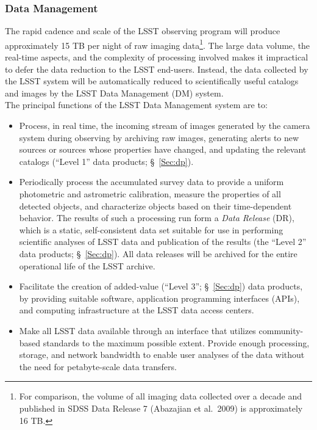 \documentclass{emulateapj}
\begin{document}
\vskip 0.2in
\subsubsection{ Data Management }
\label{sec:dm}

The rapid cadence and scale of the LSST observing program will produce
approximately 15 TB per night of raw imaging data\footnote{For
  comparison, the volume of all imaging data collected over a decade
  and published in SDSS Data Release 7 (Abazajian et al.~2009) is approximately 16 TB.}. The large data volume, the real-time aspects, and the complexity of processing involved makes it impractical to defer the data reduction to the LSST end-users. Instead, the data collected by the LSST system will be automatically reduced to scientifically useful catalogs and images by the LSST Data Management (DM) system.
\\

The principal functions of the LSST Data Management system are to: 
\begin{itemize}
\item Process, in real time, the incoming stream of images generated by the camera system during observing by archiving raw images, generating alerts to new sources or sources whose properties have changed, and updating the relevant catalogs (``Level 1'' data products; \S~\ref{Sec:dp}).
\item Periodically process the accumulated survey data to provide a
  uniform photometric and astrometric calibration, measure the
  properties of all detected objects, and characterize objects based on their time-dependent behavior. The results of such a processing run form a {\em Data Release} (DR), which is a static, self-consistent data set suitable for use in performing scientific analyses of LSST data and publication of the results (the ``Level 2'' data products; \S~\ref{Sec:dp}). All data releases will be archived for the entire operational life of the LSST archive.
\item Facilitate the creation of added-value (``Level 3'';
  \S~\ref{Sec:dp}) data products, by providing suitable software,
  application programming interfaces (APIs),  
and computing infrastructure at the LSST data access centers.
\item Make all LSST data available through an interface that utilizes
community-based standards   to the maximum possible extent. Provide
  enough processing, storage, and network bandwidth to enable user
  analyses of the data without the need for petabyte-scale data
  transfers. 
\end{itemize}
\end{document}

